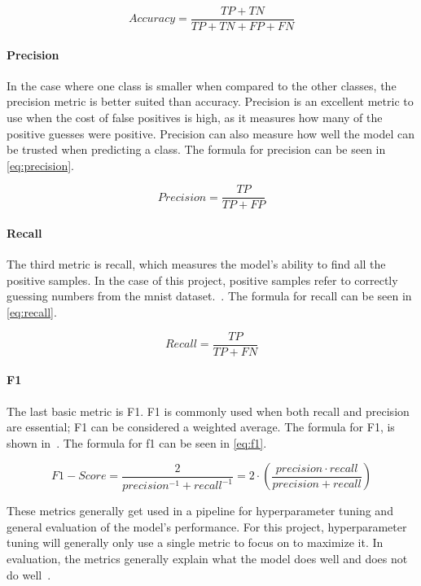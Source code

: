 \begin{equation}
    Accuracy = \frac{TP + TN}{TP + TN + FP + FN}
\end{equation}\label{eq:accuracy}

\paragraph{Precision} In the case where one class is smaller when compared to the other classes, the precision metric is better suited than accuracy. Precision is an excellent metric to use when the cost of false positives is high, as it measures how many of the positive guesses were positive. Precision can also measure how well the model can be trusted when predicting a class\cite{metrics-for-multi}. The formula for precision can be seen in \ref{eq:precision}.

\begin{equation}
    Precision = \frac{TP}{TP + FP}
\end{equation}\label{eq:precision}

\paragraph{Recall} The third metric is recall, which measures the model's ability to find all the positive samples. In the case of this project, positive samples refer to correctly guessing numbers from the \gls{mnist} dataset.~\cite{metrics-for-multi}. The formula for recall can be seen in \ref{eq:recall}.

\begin{equation}
    Recall = \frac{TP}{TP + FN}
\end{equation}\label{eq:recall}

\paragraph{F1} The last basic metric is F1. F1 is commonly used when both recall and precision are essential; F1 can be considered a weighted average. The formula for F1, is shown in~\cite{metrics-for-multi}. The formula for f1 can be seen in \ref{eq:f1}.

\begin{equation}
    F1-Score = \frac{2}{precision^{-1} + recall^{-1}} = 2\cdot (\frac{precision \cdot recall}{precision + recall})
\end{equation}\label{eq:f1}

These metrics generally get used in a pipeline for hyperparameter tuning and general evaluation of the model's performance. For this project, hyperparameter tuning will generally only use a single metric to focus on to maximize it. In evaluation, the metrics generally explain what the model does well and does not do well~\cite{james-statistical-learning}.

